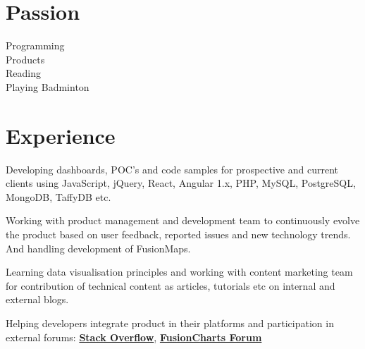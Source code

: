 \documentclass[]{gagan-resume}
\begin{document}
\begin{minipage}[t]{0.33\textwidth}

\section{Passion}
Programming \\
Products \\
Reading \\
Playing Badminton \\
\sectionsep



\end{minipage} 
\hfill
\begin{minipage}[t]{0.66\textwidth}


\section{Experience}

\vspace{\topsep} %
\begin{tightemize}
\item Developing dashboards, POC’s and code samples for prospective and current clients using JavaScript, jQuery, React, Angular 1.x, PHP, MySQL, PostgreSQL, MongoDB, TaffyDB etc.
\item Working with product management and development team to continuously evolve the product based on user feedback, reported issues and new technology trends. And handling development of FusionMaps.
\item Learning data visualisation principles and working with content marketing team for contribution of technical content as articles, tutorials etc on internal and external blogs.
\item Helping developers integrate product in their platforms and participation in external forums: \textbf{\href{https://stackoverflow.com/users/4129965/sikrigagan}{Stack Overflow}}, \textbf{\href{http://forum.fusioncharts.com/profile/67674-gagan-sikri/}{FusionCharts Forum}} 
\end{tightemize}
\sectionsep


\end{minipage}
\end{document}
